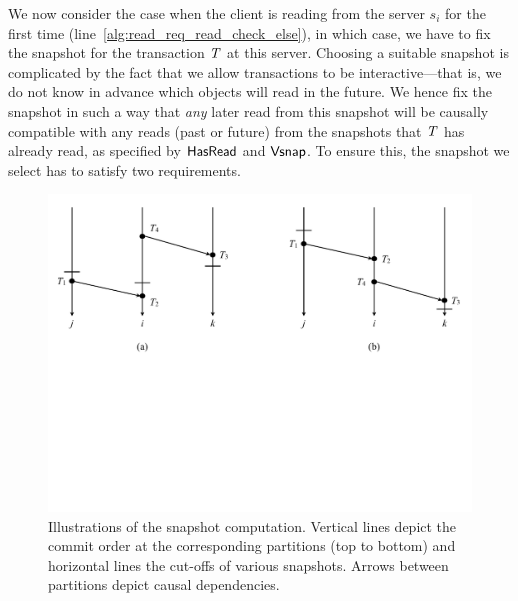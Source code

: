 
We now consider the case when the client is reading from the server $s_i$ for the first time (line~\ref{alg:read_req_read_check_else}), in which case, we have to fix the snapshot for the transaction $\mathit{T}$ at this server. Choosing a suitable snapshot is complicated by the fact that we allow transactions to be interactive---that is, we do not know in advance which objects will read in the future. We hence fix the snapshot in such a way that \emph{any} later read from this snapshot will be causally  compatible with any reads (past or future) from the snapshots that $\mathit{T}$ has already read, as specified by $\mathsf{HasRead}$ and $\mathsf{Vsnap}$. To ensure this, the snapshot we select has to satisfy two requirements.

\begin{figure}[t]
\includegraphics[width=\textwidth]{figures/ch4_snapshot.pdf}
\vspace{-6.5cm}
\caption{Illustrations of the snapshot computation. Vertical lines depict the
  commit order at the corresponding partitions (top to bottom) and horizontal
  lines the cut-offs of various snapshots. Arrows between partitions depict
  causal dependencies. }
\label{fig:snapshot}
\end{figure}


